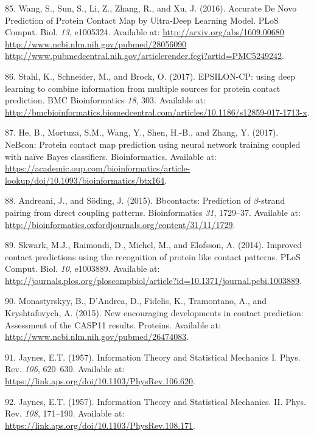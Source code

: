 \documentclass[11pt,a4paper,twoside]{book}
\theoremstyle{definition}
\theoremstyle{definition}
\theoremstyle{remark}
\begin{document}
\hypertarget{ref-Wang2016a}{}
85. Wang, S., Sun, S., Li, Z., Zhang, R., and Xu, J. (2016). Accurate De
Novo Prediction of Protein Contact Map by Ultra-Deep Learning Model.
PLoS Comput. Biol. \emph{13}, e1005324. Available at:
\href{http://arxiv.org/abs/1609.00680\%20http://www.ncbi.nlm.nih.gov/pubmed/28056090\%20http://www.pubmedcentral.nih.gov/articlerender.fcgi?artid=PMC5249242}{http://arxiv.org/abs/1609.00680 http://www.ncbi.nlm.nih.gov/pubmed/28056090 http://www.pubmedcentral.nih.gov/articlerender.fcgi?artid=PMC5249242}.

\hypertarget{ref-Stahl2017}{}
86. Stahl, K., Schneider, M., and Brock, O. (2017). EPSILON-CP: using
deep learning to combine information from multiple sources for protein
contact prediction. BMC Bioinformatics \emph{18}, 303. Available at:
\url{http://bmcbioinformatics.biomedcentral.com/articles/10.1186/s12859-017-1713-x}.

\hypertarget{ref-He2017}{}
87. He, B., Mortuza, S.M., Wang, Y., Shen, H.-B., and Zhang, Y. (2017).
NeBcon: Protein contact map prediction using neural network training
coupled with naïve Bayes classifiers. Bioinformatics. Available at:
\url{https://academic.oup.com/bioinformatics/article-lookup/doi/10.1093/bioinformatics/btx164}.

\hypertarget{ref-Andreani2015a}{}
88. Andreani, J., and Söding, J. (2015). Bbcontacts: Prediction of
\(\beta\)-strand pairing from direct coupling patterns. Bioinformatics
\emph{31}, 1729--37. Available at:
\url{http://bioinformatics.oxfordjournals.org/content/31/11/1729}.

\hypertarget{ref-Skwark2014a}{}
89. Skwark, M.J., Raimondi, D., Michel, M., and Elofsson, A. (2014).
Improved contact predictions using the recognition of protein like
contact patterns. PLoS Comput. Biol. \emph{10}, e1003889. Available at:
\url{http://journals.plos.org/ploscompbiol/article?id=10.1371/journal.pcbi.1003889}.

\hypertarget{ref-Monastyrskyy2015}{}
90. Monastyrskyy, B., D'Andrea, D., Fidelis, K., Tramontano, A., and
Kryshtafovych, A. (2015). New encouraging developments in contact
prediction: Assessment of the CASP11 results. Proteins. Available at:
\url{http://www.ncbi.nlm.nih.gov/pubmed/26474083}.

\hypertarget{ref-Jaynes1957a}{}
91. Jaynes, E.T. (1957). Information Theory and Statistical Mechanics I.
Phys. Rev. \emph{106}, 620--630. Available at:
\url{https://link.aps.org/doi/10.1103/PhysRev.106.620}.

\hypertarget{ref-Jaynes1957b}{}
92. Jaynes, E.T. (1957). Information Theory and Statistical Mechanics.
II. Phys. Rev. \emph{108}, 171--190. Available at:
\url{https://link.aps.org/doi/10.1103/PhysRev.108.171}.
\end{document}
